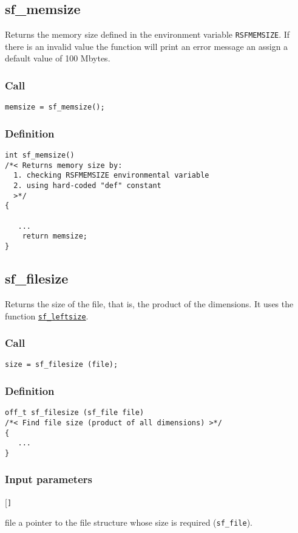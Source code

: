 \subsection{{sf\_memsize}}
Returns the memory size defined in the environment variable \texttt{RSFMEMSIZE}. If there is an invalid value the function will print an error message an assign a default value of 100 Mbytes.

\subsubsection*{Call}
\begin{verbatim}memsize = sf_memsize();\end{verbatim}

\subsubsection*{Definition}
\begin{verbatim}
int sf_memsize()
/*< Returns memory size by:
  1. checking RSFMEMSIZE environmental variable
  2. using hard-coded "def" constant
  >*/
{

   ...
    return memsize;
}
\end{verbatim}




\subsection{{sf\_filesize}}
Returns the size of the file, that is, the product of the dimensions. It uses the function \hyperref[sec:sf_leftsize]{\texttt{sf\_leftsize}}.

\subsubsection*{Call}
\begin{verbatim}size = sf_filesize (file);\end{verbatim}

\subsubsection*{Definition}
\begin{verbatim}
off_t sf_filesize (sf_file file) 
/*< Find file size (product of all dimensions) >*/
{    
   ...
}
\end{verbatim}

\subsubsection*{Input parameters}
\begin{desclist}{\tt }{\quad}[\tt ]
   \setlength\itemsep{0pt}
   \item[file] a pointer to the file structure whose size is required (\texttt{sf\_file}).  
\end{desclist}


